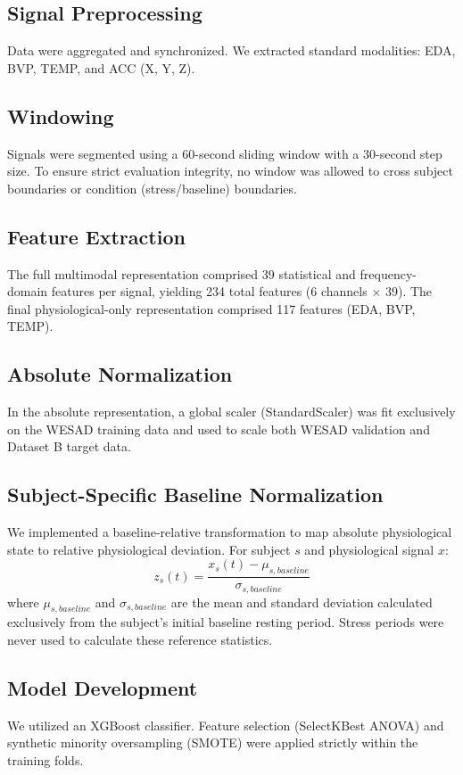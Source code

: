 \documentclass[journal]{IEEEtran}
\begin{document}
\subsection{Signal Preprocessing}
Data were aggregated and synchronized. We extracted standard modalities: EDA, BVP, TEMP, and ACC (X, Y, Z). 

\subsection{Windowing}
Signals were segmented using a 60-second sliding window with a 30-second step size. To ensure strict evaluation integrity, no window was allowed to cross subject boundaries or condition (stress/baseline) boundaries.

\subsection{Feature Extraction}
The full multimodal representation comprised 39 statistical and frequency-domain features per signal, yielding 234 total features (6 channels $\times$ 39). The final physiological-only representation comprised 117 features (EDA, BVP, TEMP).

\subsection{Absolute Normalization}
In the absolute representation, a global scaler (StandardScaler) was fit exclusively on the WESAD training data and used to scale both WESAD validation and Dataset B target data.

\subsection{Subject-Specific Baseline Normalization}
We implemented a baseline-relative transformation to map absolute physiological state to relative physiological deviation. For subject $s$ and physiological signal $x$:
\begin{equation}
z_s(t) = \frac{x_s(t) - \mu_{s,baseline}}{\sigma_{s,baseline}}
\end{equation}
where $\mu_{s,baseline}$ and $\sigma_{s,baseline}$ are the mean and standard deviation calculated exclusively from the subject's initial baseline resting period. Stress periods were never used to calculate these reference statistics. 

\subsection{Model Development}
We utilized an XGBoost classifier. Feature selection (SelectKBest ANOVA) and synthetic minority oversampling (SMOTE) were applied strictly within the training folds.
\end{document}
